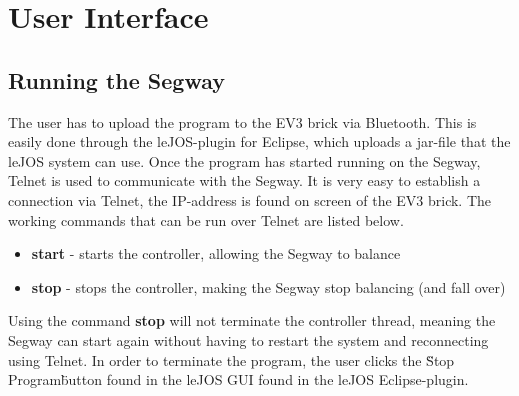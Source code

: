 


\section{User Interface}

\subsection{Running the Segway}


The user has to upload the program to the EV3 brick via Bluetooth. This is easily done through the leJOS-plugin for Eclipse, which uploads a jar-file that the leJOS system can use.
Once the program has started running on the Segway, Telnet is used to communicate with the Segway. It is very easy to establish a connection via Telnet, the IP-address is found on screen of the EV3 brick. The working commands that can be run over Telnet are listed below.

\begin{itemize}
\item \textbf{start} - starts the controller, allowing the Segway to balance
\item \textbf{stop} - stops the controller, making the Segway stop balancing (and fall over)
\end{itemize}

\noindent Using the command \textbf{stop} will not terminate the controller thread, meaning the Segway can start again without having to restart the system and reconnecting using Telnet. In order to terminate the program, the user clicks the \"Stop Program\" button found in the leJOS GUI found in the leJOS Eclipse-plugin.

